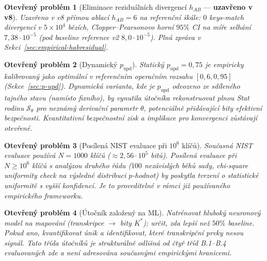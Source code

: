 \documentclass[11pt,a4paper]{article}
\newtheorem{openproblem}{Otev\v{r}en\'y probl\'em}
\begin{document}
\begin{openproblem}[Eliminace reziduálních divergencí $h_{AB}$ — \textbf{uzavřeno v v8}]\label{prob:hab-residual}
Uzavřeno v v8 přímou ablací $h_{AB} = 6$ na referenční škále: $0$ keys-match divergencí v $5 \times 10^4$ bězích, Clopper--Pearsonovo horní $95\%$ CI na míře selhání $7{,}38 \cdot 10^{-5}$ (pod baseline reference v2 $8{,}0 \cdot 10^{-5}$). Plná zpráva v Sekci~\ref{sec:empirical-habresidual}.
\end{openproblem}

\begin{openproblem}[Dynamický $p_\text{upd}$]\label{prob:pupd-dynamic}
Statický $p_\text{upd} = 0{,}75$ je empiricky kalibrovaný jako optimální v referenčním operačním rozsahu $[0{,}6, 0{,}95]$ (Sekce~\ref{sec:p-upd}). Dynamická varianta, kde je $p_\text{upd}$ odvozeno ze sdíleného tajného stavu (namísto fixního), by vynutila útočníka rekonstruovat plnou Stat rodinu $\mathcal{S}_\theta$ pro neznámý derivační parametr $\theta$, potenciálně přidávající bity efektivní bezpečnosti. Kvantitativní bezpečnostní zisk a implikace pro konvergenci zůstávají otevřené.
\end{openproblem}

\begin{openproblem}[Posílená NIST evaluace při $10^6$ klíčů]\label{prob:nist-strong}
Současná NIST evaluace používá $N = 1000$ klíčů ($\approx 2{,}56 \cdot 10^5$ bitů). Posílená evaluace při $N \geq 10^6$ klíčů s analýzou druhého řádu ($100$ nezávislých běhů sady, chi-square uniformity check na výsledné distribuci $p$-hodnot) by poskytla tvrzení o statistické uniformitě s vyšší konfidencí. Je to proveditelné v rámci již používaného empirického frameworku.
\end{openproblem}

\begin{openproblem}[Útočník založený na ML]\label{prob:ml}
Natrénovat hluboký neuronový model na mapování (transkripce $\to$ bity $K^*$); určit, zda lepší než $50\%$ baseline. Pokud ano, kvantifikovat únik a identifikovat, které transkripční prvky nesou signál. Tato třída útočníků je strukturálně odlišná od čtyř tříd B.1--B.4 evaluovaných zde a není adresována současnými empirickými hranicemi.
\end{openproblem}
\end{document}
